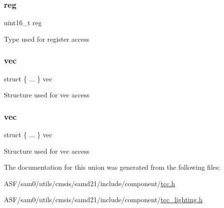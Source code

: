 \subsubsection{\texorpdfstring{reg}{reg}}
{\footnotesize\ttfamily uint16\+\_\+t reg}

Type used for register access \mbox{\label{union_t_c_c___p_a_t_t___type_a837db09290e231e369702f5eeb5b7d39}} 
\subsubsection{\texorpdfstring{vec}{vec}\hspace{0.1cm}{\footnotesize\ttfamily [1/2]}}
{\footnotesize\ttfamily struct \{ ... \}   vec}

Structure used for vec access \mbox{\label{union_t_c_c___p_a_t_t___type_a2d12389f004832d3435d45c62a830574}} 
\subsubsection{\texorpdfstring{vec}{vec}\hspace{0.1cm}{\footnotesize\ttfamily [2/2]}}
{\footnotesize\ttfamily struct \{ ... \}   vec}

Structure used for vec access 

The documentation for this union was generated from the following files\+:\begin{DoxyCompactItemize}
\item 
A\+S\+F/sam0/utils/cmsis/samd21/include/component/\mbox{\hyperlink{tcc_8h}{tcc.\+h}}\item 
A\+S\+F/sam0/utils/cmsis/samd21/include/component/\mbox{\hyperlink{tcc__lighting_8h}{tcc\+\_\+lighting.\+h}}\end{DoxyCompactItemize}
